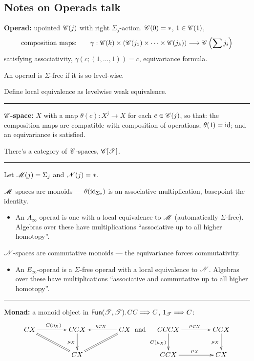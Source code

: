 \documentclass[11pt]{article}
\newcommand{\KanSemResponse}[1]
{
\thispagestyle{fancy}
\section{#1}
}
\begin{document}
\begin{Operads}
\KanSemResponse{Notes on Operads talk}
\begin{itemise}
\item \textbf{Operad:} upointed $\mathscr{C}(j)$ with right $\Sigma_j$-action. $\mathscr{C}(0)=*$, $1\in\mathscr{C}(1)$, 
\[\textup{composition maps:\qquad }\gamma:\mathscr{C}(k)\times\left(\mathscr{C}(j_1)\times\cdots \times\mathscr{C}(j_k)\right)
\longrightarrow\mathscr{C}\left(\sum j_i\right)\]
satisfying associativity, $\gamma(c;(1,\ldots,1))=c$, equivariance formula.
\item An operad is $\Sigma$-free if it is so level-wise.
\item Define local equivalence as levelwise weak equivalence.
\hrule
\item \textbf{$\mathscr{C}$-space:} $X$ with a map $\theta(c):X^j\to X$ for each $c\in \mathscr{C}(j)$, so that: the composition maps are compatible with composition of operations; $\theta(1)=\textup{id}$; and an equivariance is satisfied.
\item There's a category of $\mathscr{C}$-spaces, $\mathscr{C}[\mathscr{T}]$.
\hrule
\item Let $\mathscr{M}(j)=\Sigma_j$ and $\mathscr{N}(j)=*$. 
\item $\mathscr{M}$-spaces are monoids --- $\theta(\textup{id}_{\Sigma_2})$ is an associative multiplication, basepoint the identity.
\begin{itemize}\squishlist
\item An $A_\infty$ operad is one with a local equivalence to $\mathscr{M}$ (automatically $\Sigma$-free). Algebras over these have multiplications ``associative up to all higher homotopy''.
\end{itemize}
\item $\mathscr{N}$-spaces are commutative monoids --- the equivariance forces commutativity. 
\begin{itemize}\squishlist
\item An $E_\infty$-operad is a $\Sigma$-free operad with a local equivalence to $\mathscr{N}$. Algebras over these have multiplications ``associative and commutative up to all higher homotopy''.
\end{itemize}
\hrule
\item \textbf{Monad:} a monoid object in $\operatorname{{\mathsf{Fun}}}(\mathscr{T},\mathscr{T})$.\qquad  $CC\Longrightarrow C$, $1_{\mathscr{T}}\Longrightarrow C$:
\[\xymatrix@C=1.5cm{
CX\ar[r]^{C(\eta_X)}&CCX\ar[d]_{\mu_X}& CX\ar[l]_{\eta_{CX}}\\
&CX\ar@{=}[lu]\ar@{=}[ru]
}
\text{ and }
\xymatrix@C=1.5cm{
CCCX\ar[r]^{\mu_{CX}}\ar[d]_{C(\mu_X)} &CCX\ar[d]_{\mu_X}\\
CCX\ar[r]^{\mu_X}&CX
}\]
\end{itemise}
\end{Operads}
\end{document}

